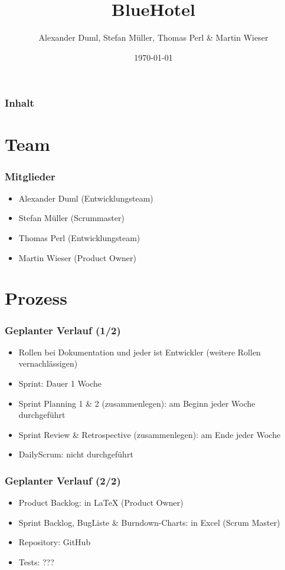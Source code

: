 \documentclass{beamer}
\begin{document}
\title{BlueHotel}
\author{Alexander Duml, Stefan M\"uller, Thomas Perl \& Martin Wieser}
\date{\today}

\begin{frame}
\titlepage
\end{frame}

\begin{frame}
\frametitle{Inhalt}\tableofcontents
\end{frame}



\section{Team}

\begin{frame}
\frametitle{Mitglieder}
\begin{itemize}
\item Alexander Duml (Entwicklungsteam)
\item Stefan M\"uller (Scrummaster)
\item Thomas Perl (Entwicklungsteam)
\item Martin Wieser (Product Owner)
\end{itemize}
\end{frame}

\section{Prozess}

\begin{frame}
\frametitle{Geplanter Verlauf (1/2)}
\begin{itemize}
\item Rollen bei Dokumentation und jeder ist Entwickler (weitere Rollen vernachl\"assigen)
\item Sprint: Dauer 1 Woche
\end{itemize}
\begin{itemize}
\item Sprint Planning 1 \& 2 (zusammenlegen): am Beginn jeder Woche durchgef\"uhrt
\item Sprint Review \& Retrospective (zusammenlegen): am Ende jeder Woche
\item DailyScrum: nicht durchgef\"uhrt
\end{itemize}
\end{frame}

\begin{frame}
\frametitle{Geplanter Verlauf (2/2)}
\begin{itemize}
\item Product Backlog: in LaTeX (Product Owner)
\item Sprint Backlog, BugListe \& Burndown-Charts: in Excel (Scrum Master)
\item Repository: GitHub
\item Tests: ???
\end{itemize}
\end{frame}
\end{document}
